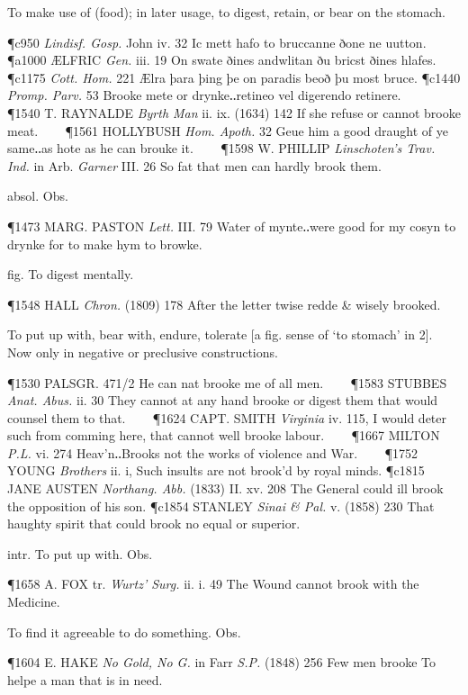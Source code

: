 \begin{description}[wide, labelwidth=!, labelindent=0pt]
\begin{myenumerate}
 To make use of (food); in later usage, to digest, retain, or bear on the stomach.

\P c950 \textit{Lindisf. Gosp.} John iv. 32 Ic mett hafo to bruccanne ðone  ne uutton.
\P a1000 ÆLFRIC  \textit{Gen.} iii. 19 On swate ðines andwlitan ðu bricst ðines hlafes.
\P c1175 \textit{Cott. Hom.} 221 Ælra þara þing þe on paradis beoð þu most bruce.
\P c1440 \textit{Promp. Parv.} 53 Brooke mete or drynke‥retineo vel digerendo retinere.    
\P 1540 T. RAYNALDE  \textit{Byrth Man} ii. ix. (1634) 142 If she refuse or cannot brooke meat.    
\P 1561 HOLLYBUSH  \textit{Hom. Apoth.} 32 Geue him a good draught of ye same‥as hote as he can brouke it.    
\P 1598 W. PHILLIP  \textit{Linschoten's Trav. Ind.} in Arb. \textit{Garner} III. 26 So fat that men can hardly brook them.

 absol. Obs.

\P 1473 MARG. PASTON  \textit{Lett.} III. 79 Water of mynte‥were good for my cosyn to drynke for to make hym to browke.

 fig. To digest mentally.

\P 1548 HALL  \textit{Chron.} (1809) 178 After the letter twise redde \& wisely brooked.

 To put up with, bear with, endure, tolerate [a fig. sense of ‘to stomach’ in 2]. Now only in negative or preclusive constructions.

\P 1530 PALSGR. 471/2 He can nat brooke me of all men.    
\P 1583 STUBBES  \textit{Anat. Abus.} ii. 30 They cannot at any hand brooke or digest them that would counsel them to that.    
\P 1624 CAPT. SMITH  \textit{Virginia} iv. 115, I would deter such from comming here, that cannot well brooke labour.    
\P 1667 MILTON  \textit{P.L.} vi. 274 Heav'n‥Brooks not the works of violence and War.    
\P 1752 YOUNG  \textit{Brothers} ii. i, Such insults are not brook'd by royal minds.
\P c1815 JANE AUSTEN  \textit{Northang. Abb.} (1833) II. xv. 208 The General could ill brook the opposition of his son.
\P c1854 STANLEY  \textit{Sinai \& Pal.} v. (1858) 230 That haughty spirit that could brook no equal or superior.

 intr. To put up with. Obs.

\P 1658 A. FOX tr. \textit{Wurtz' Surg.} ii. i. 49 The Wound cannot brook with the Medicine.

 To find it agreeable to do something. Obs.

\P 1604 E. HAKE  \textit{No Gold, No G.} in Farr \textit{S.P.} (1848) 256 Few men brooke To helpe a man that is in need.


\end{myenumerate}
\end{description}
